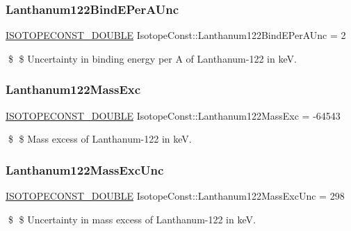 \subsubsection{\texorpdfstring{Lanthanum122\+Bind\+E\+Per\+A\+Unc}{Lanthanum122BindEPerAUnc}}
{\footnotesize\ttfamily \mbox{\hyperlink{group___isotope_const-_macros_ga8f45a7272ce02c0b4c65c44636ed719a}{I\+S\+O\+T\+O\+P\+E\+C\+O\+N\+S\+T\+\_\+\+D\+O\+U\+B\+LE}} Isotope\+Const\+::\+Lanthanum122\+Bind\+E\+Per\+A\+Unc = 2}

\$ \$ Uncertainty in binding energy per A of Lanthanum-\/122 in keV. \mbox{\label{group___isotope_const-_lanthanum-_la122_ga5bfc5b3f550d2d728813d950029665a5}} 
\subsubsection{\texorpdfstring{Lanthanum122\+Mass\+Exc}{Lanthanum122MassExc}}
{\footnotesize\ttfamily \mbox{\hyperlink{group___isotope_const-_macros_ga8f45a7272ce02c0b4c65c44636ed719a}{I\+S\+O\+T\+O\+P\+E\+C\+O\+N\+S\+T\+\_\+\+D\+O\+U\+B\+LE}} Isotope\+Const\+::\+Lanthanum122\+Mass\+Exc = -\/64543}

\$ \$ Mass excess of Lanthanum-\/122 in keV. \mbox{\label{group___isotope_const-_lanthanum-_la122_ga3dc7701e77df412bd67abcb7401f35f9}} 
\subsubsection{\texorpdfstring{Lanthanum122\+Mass\+Exc\+Unc}{Lanthanum122MassExcUnc}}
{\footnotesize\ttfamily \mbox{\hyperlink{group___isotope_const-_macros_ga8f45a7272ce02c0b4c65c44636ed719a}{I\+S\+O\+T\+O\+P\+E\+C\+O\+N\+S\+T\+\_\+\+D\+O\+U\+B\+LE}} Isotope\+Const\+::\+Lanthanum122\+Mass\+Exc\+Unc = 298}

\$ \$ Uncertainty in mass excess of Lanthanum-\/122 in keV. \mbox{\label{group___isotope_const-_lanthanum-_la122_ga8b4a5f72b74ed6df84b6f5067ae371cb}} 
